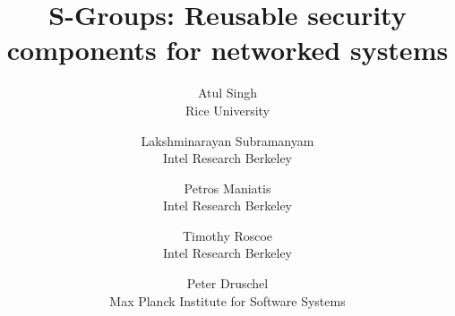 \documentclass[letterpaper,twocolumn,10pt]{article}
\begin{document}
\title{S-Groups: Reusable security components for networked systems}
\author{
{\rm Atul Singh}\\
Rice University
\and
{\rm Lakshminarayan Subramanyam}\\
Intel Research Berkeley
\and
{\rm Petros Maniatis}\\
Intel Research Berkeley 
\and
{\rm Timothy Roscoe}\\
Intel Research Berkeley
\and 
{\rm Peter Druschel}\\
Max Planck Institute for Software Systems 
}
\fi
\maketitle





%
%
\end{document}
